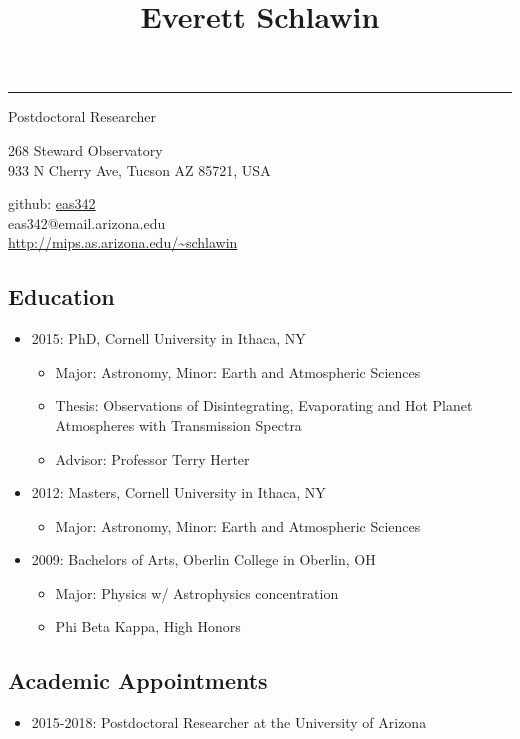 \documentclass[11pt, oneside]{article}   	%
\title{Everett Schlawin}
\date{}							%
\begin{document}
\maketitle
\vspace{-0.85in}
\begin{centering}
\rule{6in}{0.03in}
Postdoctoral Researcher

268 Steward Observatory\\
933 N Cherry Ave, Tucson AZ 85721, USA

github: \href{https://github.com/eas342}{eas342}\\
eas342@email.arizona.edu\\
\url{http://mips.as.arizona.edu/~schlawin}

\end{centering}

\subsection*{Education}
\begin{itemize}[noitemsep]
	\item 2015: PhD, Cornell University in Ithaca, NY
		\begin{itemize}[noitemsep]
		\item Major: Astronomy, Minor: Earth and Atmospheric Sciences
		\item Thesis: Observations of Disintegrating, Evaporating and Hot Planet Atmospheres with Transmission Spectra
		\item Advisor: Professor Terry Herter
		\end{itemize}
	\item 2012: Masters, Cornell University in Ithaca, NY
		\begin{itemize}[noitemsep]
		\item Major: Astronomy, Minor: Earth and Atmospheric Sciences
		\end{itemize}
	\item 2009: Bachelors of Arts, Oberlin College in Oberlin, OH
		\begin{itemize}[noitemsep]
		\item Major: Physics w/ Astrophysics concentration
		\item Phi Beta Kappa, High Honors
		\end{itemize}
\end{itemize}

\subsection*{Academic Appointments}
\begin{itemize}[noitemsep]
	\item 2015-2018: Postdoctoral Researcher at the University of Arizona
\end{itemize}
\end{document}
